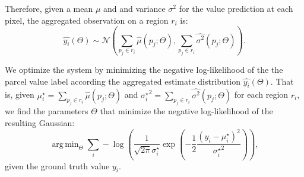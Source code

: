 \documentclass[10pt,twocolumn,a4paper]{article}
\DeclareMathOperator*{\argmin}{arg\,min}
\begin{document}
Therefore, given a mean $\mu$ and and variance $\sigma^{2}$ for the value prediction at each pixel, the aggregated observation on a region $r_i$ is: 
\begin{equation}\label{eq:aggregated_gaussian}
    \hat{y_i}(\Theta) \sim \mathsf{\mathcal{N}}\left(\sum_{p_j\in r_i}\hat{\mu}( p_j; \Theta),\sum_{p_j\in r_i}\hat{\sigma^{2}}( p_j; \Theta)\right).
\end{equation}

We optimize the system by minimizing the negative log-likelihood of the the parcel value label according the aggregated estimate distribution $\hat{y_i}(\Theta)$. That is, given $\mu_i^\star = \sum_{p_j\in r_i}\hat{\mu}( p_j; \Theta)$ and ${\sigma_i^\star}^2 = \sum_{p_j\in r_i}\hat{\sigma^{2}}( p_j; \Theta)$ for each region $r_i$, we find the parameters $\Theta$ that minimize the negative log-likelihood of the resulting Gaussian:
\begin{equation}\label{eq:nll}
    \argmin_\Theta \sum_{i} -\log\left( 
     \frac{1}{\sqrt{2\pi}\sigma_i^\star} \exp\left(-\frac{1}{2} \frac{\left(y_i - \mu_i^\star\right)^2}{{\sigma_i^\star}^2} \right)\right),
\end{equation}
given the ground truth value $y_i$.




\end{document}

